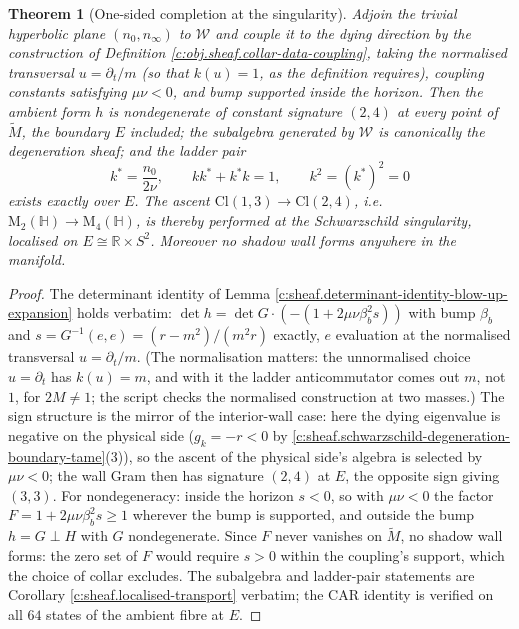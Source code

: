 \documentclass[11pt]{article}
\newtheorem{theorem}{Theorem}[section]
\theoremstyle{definition}
\theoremstyle{plain}
\newcommand{\changedmark}[2]{\marginpar{\raggedright\scriptsize\color{#1}#2}}
\providecommand{\Cl}{}\renewcommand{\Cl}{\mathrm{Cl}}
\providecommand{\HH}{}\renewcommand{\HH}{\mathbb{H}}
\providecommand{\Mat}{}\renewcommand{\Mat}{\mathrm{M}}
\providecommand{\Mt}{}\renewcommand{\Mt}{\widetilde{M}}
\providecommand{\R}{}\renewcommand{\R}{\mathbb{R}}
\providecommand{\nInf}{}\renewcommand{\nInf}{n_\infty}
\providecommand{\nO}{}\renewcommand{\nO}{n_0}
\providecommand{\shW}{}\renewcommand{\shW}{\mathcal{W}}
\begin{document}
\begin{theorem}[One-sided completion at the singularity]\label{c:sheaf.one-sided-completion-singularity}
\changedmark{gray}{reworded}
Adjoin the trivial hyperbolic plane $(\nO, \nInf)$ to $\shW$ and couple it to the dying direction by the construction of Definition \ref{c:obj.sheaf.collar-data-coupling}, taking the normalised transversal $u = \partial_t/m$ (so that $k(u) = 1$, as the definition requires), coupling constants satisfying $\mu\nu < 0$, and bump supported inside the horizon. Then the ambient form $h$ is nondegenerate of constant signature $(2,4)$ at every point of $\Mt$, the boundary $E$ included; the subalgebra generated by $\shW$ is canonically the degeneration sheaf; and the ladder pair
\[
k^* = \frac{\nO}{2\nu}, \qquad k k^* + k^* k = 1, \qquad k^2 = (k^*)^2 = 0
\]
exists exactly over $E$. The ascent $\Cl(1,3) \to \Cl(2,4)$, i.e.\ $\Mat_2(\HH) \to \Mat_4(\HH)$, is thereby performed at the Schwarzschild singularity, localised on $E \cong \R \times S^2$. Moreover no shadow wall forms anywhere in the manifold.
\end{theorem}
\begin{proof}
The determinant identity of Lemma \ref{c:sheaf.determinant-identity-blow-up-expansion} holds verbatim: $\det h = \det G \cdot (-(1 + 2\mu\nu\beta_b^2 s))$ with bump $\beta_b$ and $s = G^{-1}(e,e) = (r - m^2)/(m^2 r)$ exactly, $e$ evaluation at the normalised transversal $u = \partial_t/m$. (The normalisation matters: the unnormalised choice $u = \partial_t$ has $k(u) = m$, and with it the ladder anticommutator comes out $m$, not $1$, for $2M \neq 1$; the script checks the normalised construction at two masses.) The sign structure is the mirror of the interior-wall case: here the dying eigenvalue is negative on the physical side ($g_k = -r < 0$ by \ref{c:sheaf.schwarzschild-degeneration-boundary-tame}(3)), so the ascent of the physical side's algebra is selected by $\mu\nu < 0$; the wall Gram then has signature $(2,4)$ at $E$, the opposite sign giving $(3,3)$. For nondegeneracy: inside the horizon $s < 0$, so with $\mu\nu < 0$ the factor $F = 1 + 2\mu\nu\beta_b^2 s \geq 1$ wherever the bump is supported, and outside the bump $h = G \perp H$ with $G$ nondegenerate. Since $F$ never vanishes on $\Mt$, no shadow wall forms: the zero set of $F$ would require $s > 0$ within the coupling's support, which the choice of collar excludes. The subalgebra and ladder-pair statements are Corollary \ref{c:sheaf.localised-transport} verbatim; the CAR identity is verified on all $64$ states of the ambient fibre at $E$.

\end{proof}
\end{document}
